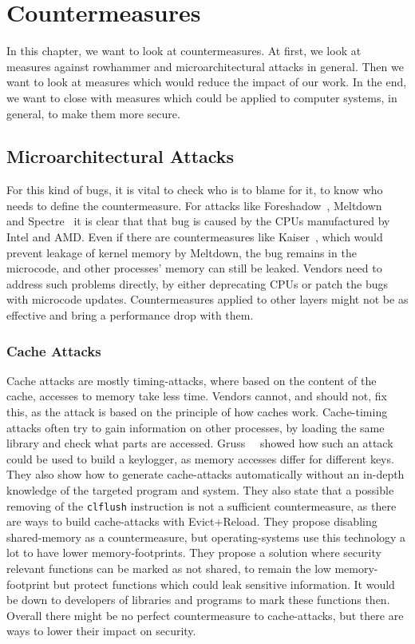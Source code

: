 \chapter{Countermeasures}\label{sec:countermeasure}

In this chapter, we want to look at countermeasures. At first, we look at
measures against rowhammer and microarchitectural attacks in general. Then we
want to look at measures which would reduce the impact of our work. In the end,
we want to close with measures which could be applied to computer systems, in
general, to make them more secure.

\section{Microarchitectural Attacks}

For this kind of bugs, it is vital to check who is to blame for it, to know who
needs to define the countermeasure. For attacks like
Foreshadow~\cite{foreshadow}, Meltdown~\cite{meltdown} and
Spectre~\cite{spectre} it is clear that that bug is caused by the CPUs
manufactured by Intel and AMD. Even if there are countermeasures like
Kaiser~\cite{kaiserpaper}, which would prevent leakage of kernel memory by
Meltdown, the bug remains in the microcode, and other processes' memory can
still be leaked. Vendors need to address such problems directly, by either
deprecating CPUs or patch the bugs with microcode updates. Countermeasures
applied to other layers might not be as effective and bring a performance drop
with them.

\subsection{Cache Attacks}

Cache attacks are mostly timing-attacks, where based on the content of the
cache, accesses to memory take less time. Vendors cannot, and should not, fix
this, as the attack is based on the principle of how caches work. Cache-timing
attacks often try to gain information on other processes, by loading the same
library and check what parts are accessed. Gruss~\etal~\cite{gruss2015cache}
showed how such an attack could be used to build a keylogger, as memory accesses
differ for different keys. They also show how to generate cache-attacks
automatically without an in-depth knowledge of the targeted program and system.
They also state that a possible removing of the \texttt{clflush} instruction is
not a sufficient countermeasure, as there are ways to build cache-attacks with
Evict+Reload. They propose disabling shared-memory as a countermeasure, but
operating-systems use this technology a lot to have lower memory-footprints.
They propose a solution where security relevant functions can be marked as not
shared, to remain the low memory-footprint but protect functions which could
leak sensitive information. It would be down to developers of libraries and
programs to mark these functions then. Overall there might be no perfect
countermeasure to cache-attacks, but there are ways to lower their impact on
security.


